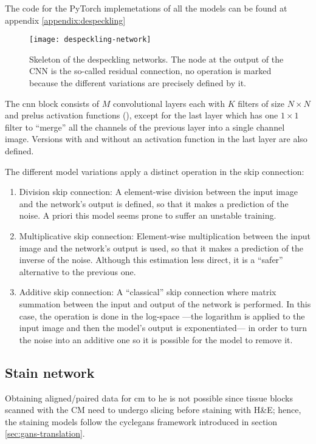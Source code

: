 \documentclass[../main.tex]{subfiles}
\begin{document}
The code for the PyTorch implemetations of all the models can be found at
appendix \ref{appendix:despeckling}

\begin{figure}[H]
\centering
\texttt{[image: despeckling-network]}
\caption{Skeleton of the despeckling networks. The node at the output of the
CNN is the so-called residual connection, no operation is marked because
the different variations are precisely defined by it.}
\label{fig:despeckling-network}
\end{figure}

The \gls{cnn} block consists of $M$ convolutional layers each with $K$ filters
of size $N \times N$ and \glspl{prelu} activation functions
(\cite{he2015delving}),
except for the last layer which has one $1 \times 1$ filter to ``merge'' all
the channels of the previous layer into a single channel image.
Versions with and without an activation function in the last layer
are also defined.

The different model variations apply a distinct operation in the skip connection:
\begin{enumerate}
  \item Division skip connection: A element-wise division between
  the input image and the network's output is defined,
  so that it makes a prediction of the noise. A priori this model seems prone
  to suffer an unstable training.
  \item Multiplicative skip connection: Element-wise multiplication between
  the input image and the network's output is used,
  so that it makes a prediction of the inverse of the noise.
  Although this estimation less direct, it is a ``safer'' alternative
  to the previous one.
  \item Additive skip connection: A ``classical'' skip connection where matrix
  summation between the input and output of the network is performed.
  In this case, the operation is done in the log-space ---the logarithm
  is applied to the input image and then the model's output is exponentiated---
  in order to turn the noise into an additive one so it is possible for the
  model to remove it.
\end{enumerate}

\subsection{Stain network}\label{sec:stain-network}

Obtaining aligned/paired data for \gls{cm} to \gls{he} is not possible since
tissue blocks scanned with the CM need to undergo slicing
before staining with H\&E; hence,
the staining models follow the \gls{cyclegans} framework introduced in section
\ref{sec:gans-translation}.
\end{document}
